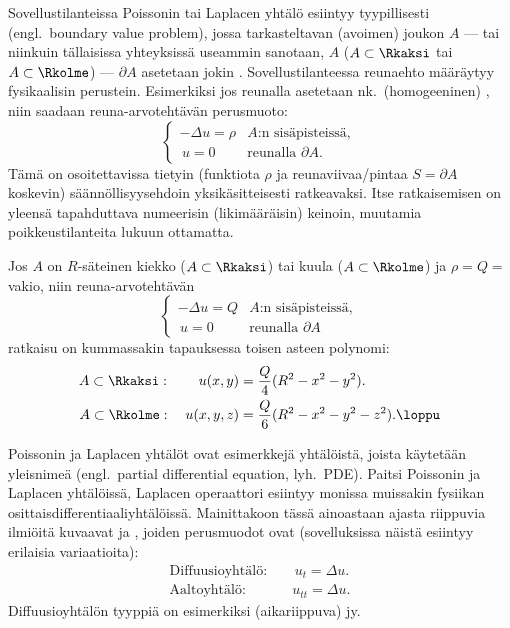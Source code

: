 Sovellustilanteissa Poissonin tai Laplacen yhtälö esiintyy tyypillisesti
% 
 (engl.\ boundary value problem), jossa tarkasteltavan (avoimen)
joukon $A$ --- tai niinkuin tällaisissa yhteyksissä useammin sanotaan,  $A$ 
($A\subset\Rkaksi$ tai $A\subset\Rkolme$) 
---  $\partial A$ asetetaan jokin . Sovellustilanteessa reunaehto
määräytyy fysikaalisin perustein. Esimerkiksi jos reunalla asetetaan nk.\ (homogeeninen) 
%
, niin saadaan reuna-arvotehtävän perusmuoto:
\[
\begin{cases} 
-\Delta u=\rho &\text{$A$:n sisäpisteissä}, \\ \,u=0 &\text{reunalla $\partial A$.}
\end{cases}
\]
Tämä on osoitettavissa tietyin (funktiota $\rho$ ja reunaviivaa/pintaa $S=\partial A$ koskevin) 
säännöllisyysehdoin yksikäsitteisesti ratkeavaksi. Itse ratkaisemisen on yleensä tapahduttava
numeerisin (likimääräisin) keinoin, muutamia poikkeustilanteita lukuun ottamatta.
\begin{Exa}
Jos $A$ on $R$-säteinen kiekko ($A\subset\Rkaksi$) tai kuula ($A\subset\Rkolme$) ja $\rho=Q=$ 
vakio, niin reuna-arvotehtävän
\[
\begin{cases} 
-\Delta u=Q &\text{$A$:n sisäpisteissä}, \\ \,u=0 &\text{reunalla $\partial A$}
\end{cases}
\]
ratkaisu on kummassakin tapauksessa toisen asteen polynomi:
\begin{align*}
A\subset\Rkaksi: \qquad u(x,y)   &= \frac{Q}{4}(R^2-x^2-y^2). \\
A\subset\Rkolme: \quad  u(x,y,z) &= \frac{Q}{6}(R^2-x^2-y^2-z^2). \loppu
\end{align*}
\end{Exa}

Poissonin ja Laplacen yhtälöt ovat esimerkkejä yhtälöistä, joista käytetään yleisnimeä 
%
 (engl.\ partial differential equation, lyh.\ PDE).
Paitsi Poissonin ja Laplacen yhtälöissä, Laplacen operaattori esiintyy monissa muissakin 
fysiikan osittaisdifferentiaaliyhtälöissä. Mainittakoon tässä ainoastaan ajasta riippuvia 
ilmiöitä kuvaavat  ja , joiden perusmuodot ovat 
(sovelluksissa näistä esiintyy erilaisia variaatioita):
\begin{align*}
\text{Diffuusioyhtälö}: \quad   &\,u_t=\Delta u. \\
\text{Aaltoyhtälö}: \qquad\,\   &u_{tt}=\Delta u.
\end{align*}
Diffuusioyhtälön tyyppiä on esimerkiksi (aikariippuva) 
jy. %


